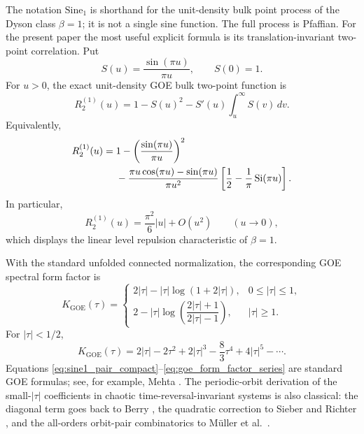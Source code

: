 \documentclass[11pt]{amsart}
\numberwithin{equation}{section}
\theoremstyle{plain}
\theoremstyle{definition}
\theoremstyle{remark}
\newcommand{\GOE}{\mathrm{GOE}}
\begin{document}
The notation $\mathrm{Sine}_1$ is shorthand for the unit-density bulk point process of the Dyson class $\beta=1$; it is not a single sine function.  The full process is Pfaffian.  For the present paper the most useful explicit formula is its translation-invariant two-point correlation.  Put
\begin{equation}
S(u)=\frac{\sin(\pi u)}{\pi u},
\qquad S(0)=1.
\label{eq:sine1_S}
\end{equation}
For $u>0$, the exact unit-density GOE bulk two-point function is
\begin{equation}
R_2^{(1)}(u)
=1-S(u)^2-S'(u)\int_u^\infty S(v)\,dv.
\label{eq:sine1_pair_compact}
\end{equation}
Equivalently,
\begin{align}
R_2^{(1)}(u)
={}&1-
\left(\frac{\sin(\pi u)}{\pi u}\right)^2\notag\\
&-
\frac{\pi u\cos(\pi u)-\sin(\pi u)}{\pi u^2}
\left[
\frac12-\frac1\pi\operatorname{Si}(\pi u)
\right].
\label{eq:sine1_pair_explicit}
\end{align}
In particular,
\begin{equation}
R_2^{(1)}(u)=\frac{\pi^2}{6}|u|+O(u^2)
\qquad (u\to0),
\label{eq:sine1_linear_repulsion}
\end{equation}
which displays the linear level repulsion characteristic of $\beta=1$.

With the standard unfolded connected normalization, the corresponding GOE spectral form factor is
\begin{equation}
K_{\GOE}(\tau)=
\begin{cases}
2|\tau|-|\tau|\log(1+2|\tau|),&0\le|\tau|\le1,\\[2mm]
2-|\tau|\log\!\left(\dfrac{2|\tau|+1}{2|\tau|-1}\right),&|\tau|\ge1.
\end{cases}
\label{eq:goe_form_factor_exact}
\end{equation}
For $|\tau|<1/2$,
\begin{equation}
K_{\GOE}(\tau)
=2|\tau|-2\tau^2+2|\tau|^3-\frac83\tau^4+4|\tau|^5-\cdots.
\label{eq:goe_form_factor_series}
\end{equation}
Equations \eqref{eq:sine1_pair_compact}--\eqref{eq:goe_form_factor_series} are standard GOE formulas; see, for example, Mehta \cite{Mehta2004}.  The periodic-orbit derivation of the small-$|\tau|$ coefficients in chaotic time-reversal-invariant systems is also classical: the diagonal term goes back to Berry \cite{Berry1985}, the quadratic correction to Sieber and Richter \cite{SieberRichter2001}, and the all-orders orbit-pair combinatorics to M\"uller et al.\ \cite{MullerEtAl2004,MullerEtAl2005}.
\end{document}
